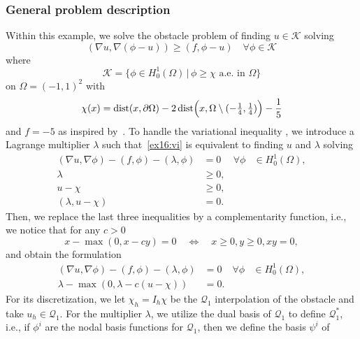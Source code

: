 \subsubsection{General problem description}
Within this example, we solve the obstacle problem
of finding $u \in \mathcal K$ solving 
\begin{equation}\label{ex16:vi}
  (\nabla u, \nabla (\phi-u)) \ge (f,\phi-u) \quad \forall \phi \in
  \mathcal K
\end{equation}
where
\[
  \mathcal K = \{\phi \in H^1_0(\Omega)\,|\, \phi \ge \chi \text{ a.e. in }\Omega\}
\]
on $\Omega = (-1,1)^2$ with
\[
 \chi(x) = \operatorname{dist}(x,\partial \Omega) - 2
 \operatorname{dist}\Bigl(x,\Omega \setminus (-\tfrac{1}{4},\tfrac{1}{4})\Bigr) -\frac{1}{5}
\]
and $f = -5$ as inspired
by~\cite[Example~7.5]{NochettoSiebertVeeser:2003}.
To handle the variational inequality ,
we introduce a Lagrange multiplier $\lambda$ such that~\eqref{ex16:vi}
is equivalent to finding $u$ and $\lambda$ solving 
\begin{equation}\label{ex16:lagrange}
  \begin{aligned}
    (\nabla u, \nabla \phi) - (f,\phi) - (\lambda,\phi) &= 0 & \forall
    \phi &\in H^1_0(\Omega),\\
    \lambda & \ge 0,\\
    u-\chi & \ge 0,\\
    (\lambda,u-\chi) &=0.
  \end{aligned}
\end{equation}
Then, we replace the last three inequalities by a complementarity
function, i.e., we notice that for any $c > 0$ 
\[
  x-\max(0,x-cy) = 0 \quad\Leftrightarrow \quad x \ge 0, y \ge 0, xy
  = 0,
\]
and obtain the formulation
\begin{equation}\label{ex16:complementarity}
  \begin{aligned}
    (\nabla u, \nabla \phi) - (f,\phi) - (\lambda,\phi) &= 0 & \forall
    \phi &\in H^1_0(\Omega),\\
    \lambda - \max(0,\lambda-c(u-\chi)) &= 0.
  \end{aligned}
\end{equation}
For its discretization, we let $\chi_h = I_h \chi$ be the $\mathcal
Q_1$ interpolation of the obstacle and take $u_h \in \mathcal Q_1$.
For the multiplier $\lambda$, we utilize the dual basis of $\mathcal
Q_1$ to define $\mathcal Q_1^*$, i.e., if $\phi^i$ are the nodal basis
functions for $\mathcal Q_1$, then we define the basis $\psi^i$ of
